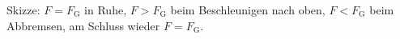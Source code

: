 Skizze: $F = F_\text{G}$ in Ruhe, $F > F_\text{G}$ beim Beschleunigen nach oben, $F < F_\text{G}$ beim Abbremsen, am Schluss wieder $F = F_\text{G}$.
